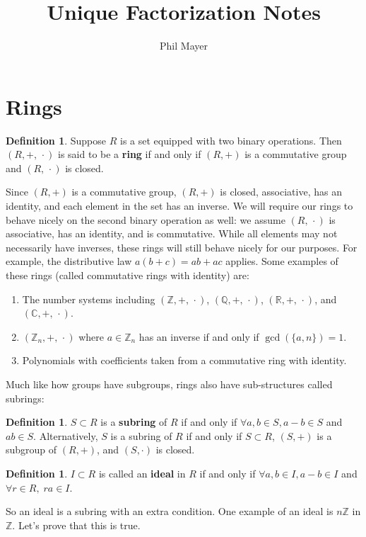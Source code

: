 \documentclass[11pt]{amsart}
\title{Unique Factorization Notes}
\author{Phil Mayer}
\theoremstyle{definition}
\newtheorem{definition}[theorem]{Definition}
\newcommand{\complexNumbers}{\mathbb{C}}
\newcommand{\reals}{\mathbb{R}}
\newcommand{\rationals}{\mathbb{Q}}
\newcommand{\integers}{\mathbb{Z}}
\newcommand{\ring}{(R, +, \, \cdot)}
\newcommand{\ringSecondOp}{(R, \, \cdot)}
\begin{document}
\maketitle

\section{Rings}
\begin{definition}
	Suppose $R$ is a set equipped with two binary operations. Then $\ring$ is said to be a \textbf{ring} if and only if $(R, +)$ is a commutative
	group and $\ringSecondOp$ is closed.
\end{definition}
Since $(R, +)$ is a commutative group, $(R, +)$ is closed, associative, has an identity, and each element in the set has an inverse. We will
require our rings to behave nicely on the second binary operation as well: we assume $\ringSecondOp$ is associative, has an identity, and is
commutative. While all elements may not necessarily have inverses, these rings will still behave nicely for our purposes. For example, the
distributive law $a(b+c) = ab + ac$ applies. Some examples of these rings (called commutative rings with identity) are:
\begin{enumerate}
	\item{
		The number systems including $(\integers, +, \, \cdot)$, $(\rationals, +, \, \cdot)$, $(\reals, +, \, \cdot)$, and 
		$(\complexNumbers, +, \, \cdot)$. }
	\item{
		$(\integers_{n}, +, \, \cdot)$ where $a \in \integers_{n}$ has an inverse if and only if $\gcd(\{ a, n \}) = 1$. }
	\item{
		Polynomials with coefficients taken from a commutative ring with identity. }
\end{enumerate}
Much like how groups have subgroups, rings also have sub-structures called subrings:
\begin{definition}
	$S \subset R$ is a \textbf{subring} of $R$ if and only if $\forall a, b \in S, a - b \in S$ and $ab \in S$. Alternatively, $S$ is a subring of $R$
	if and only if $S \subset R$, $(S, +)$ is a subgroup of $(R, +)$, and $(S, \cdot)$ is closed.
\end{definition}
\begin{definition}
	$I \subset R$ is called an \textbf{ideal} in $R$ if and only if $\forall a, b \in I, a - b \in I$ and $\forall r \in R, \; ra \in I$.
\end{definition}
So an ideal is a subring with an extra condition. One example of an ideal is $n\integers$ in $\integers$. Let's prove that this is true.
\end{document}
